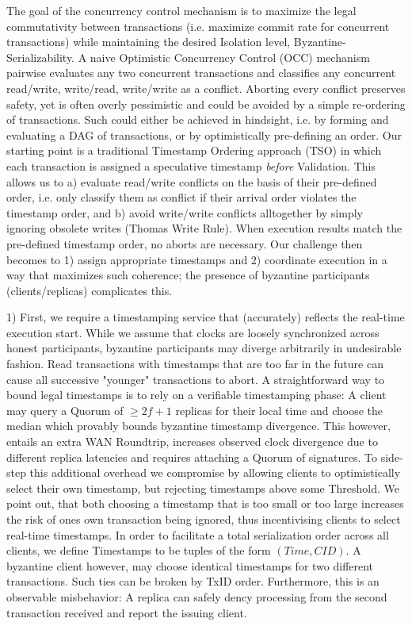 The goal of the concurrency control mechanism is to maximize the legal commutativity between transactions (i.e. maximize commit rate for concurrent transactions) while maintaining the desired Isolation level, Byzantine-Serializability. A naive Optimistic Concurrency Control (OCC) mechanism pairwise evaluates any two concurrent transactions and classifies any concurrent read/write, write/read, write/write as a conflict. Aborting every conflict preserves safety, yet is often overly pessimistic and could be avoided by a simple re-ordering of transactions. Such could either be achieved in hindsight, i.e. by forming and evaluating a DAG of transactions, or by optimistically pre-defining an order.
Our starting point is a traditional Timestamp Ordering approach (TSO) in which each transaction is assigned a speculative timestamp \textit{before} Validation. This allows us to a) evaluate read/write conflicts on the basis of their pre-defined order, i.e. only classify them as conflict if their arrival order violates the timestamp order, and b) avoid write/write conflicts alltogether by simply ignoring obsolete writes (Thomas Write Rule). 
When execution results match the pre-defined timestamp order, no aborts are necessary. Our challenge then becomes to 1) assign appropriate timestamps and 2) coordinate execution in a way that maximizes such coherence; the presence of byzantine participants (clients/replicas) complicates this.

1) First, we require a timestamping service that (accurately) reflects the real-time execution start. While we assume that clocks are loosely synchronized across honest participants, byzantine participants may diverge arbitrarily in undesirable fashion. Read transactions with timestamps that are too far in the future can cause all successive "younger" transactions to abort. 
A straightforward way to bound legal timestamps is to rely on a verifiable timestamping phase: A client may query a Quorum of $\geq 2f+1$ replicas for their local time and choose the median which provably bounds byzantine timestamp divergence. This however, entails an extra WAN Roundtrip, increases observed clock divergence due to different replica latencies and requires attaching a Quorum of signatures. To side-step this additional overhead we compromise by allowing clients to optimistically select their own timestamp, but rejecting timestamps above some Threshold. We point out, that both choosing a timestamp that is too small or too large increases the risk of ones own transaction being ignored, thus incentivising clients to select real-time timestamps. In order to facilitate a total serialization order across all clients, we define Timestamps to be tuples of the form $(Time, CID)$. A byzantine client however, may choose identical timestamps for two different transactions. Such ties can be broken by TxID order. Furthermore, this is an observable misbehavior: A replica can safely dency processing from the second transaction received and report the issuing client.

